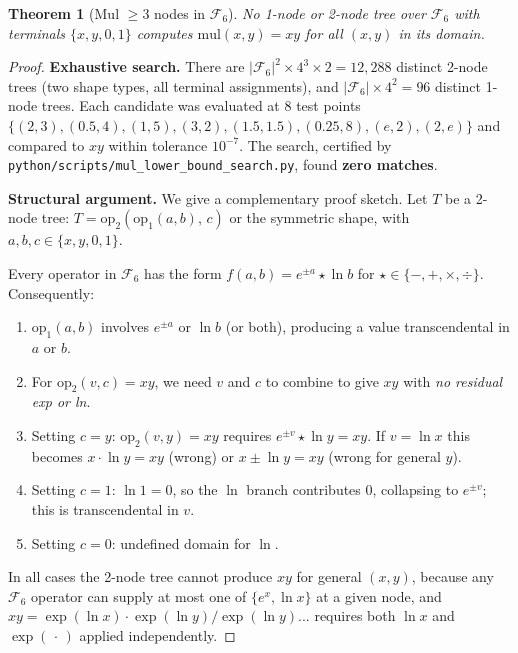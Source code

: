 \documentclass[11pt]{article}
\newtheorem{theorem}{Theorem}
\begin{document}
\begin{theorem}[Mul $\geq 3$ nodes in $\mathcal{F}_6$]\label{thm:lower6}
No 1-node or 2-node tree over $\mathcal{F}_6$ with terminals $\{x, y, 0, 1\}$
computes $\mathrm{mul}(x,y) = xy$ for all $(x,y)$ in its domain.
\end{theorem}

\begin{proof}
\textbf{Exhaustive search.}  There are $|\mathcal{F}_6|^2 \times 4^3 \times 2 = 12{,}288$
distinct 2-node trees (two shape types, all terminal assignments), and $|\mathcal{F}_6|
\times 4^2 = 96$ distinct 1-node trees.  Each candidate was evaluated at 8 test
points $\{(2,3),(0.5,4),(1,5),(3,2),(1.5,1.5),(0.25,8),(e,2),(2,e)\}$ and compared
to $xy$ within tolerance $10^{-7}$.  The search, certified by
\texttt{python/scripts/mul\_lower\_bound\_search.py}, found \textbf{zero matches}.

\smallskip
\textbf{Structural argument.}  We give a complementary proof sketch.
Let $T$ be a 2-node tree: $T = \mathrm{op}_2(\mathrm{op}_1(a,b),\, c)$ or the
symmetric shape, with $a,b,c \in \{x,y,0,1\}$.

Every operator in $\mathcal{F}_6$ has the form $f(a,b) = e^{\pm a} \star \ln b$
for $\star \in \{-,+,\times,\div\}$.  Consequently:
\begin{enumerate}
\item $\mathrm{op}_1(a,b)$ involves $e^{\pm a}$ or $\ln b$ (or both),
      producing a value transcendental in $a$ or $b$.
\item For $\mathrm{op}_2(v, c) = xy$, we need
      $v$ and $c$ to combine to give $xy$ with \emph{no residual exp or ln}.
\item Setting $c = y$: $\mathrm{op}_2(v,y) = xy$ requires
      $e^{\pm v} \star \ln y = xy$.  If $v = \ln x$ this becomes
      $x \cdot \ln y = xy$ (wrong) or $x \pm \ln y = xy$ (wrong for general $y$).
\item Setting $c = 1$: $\ln 1 = 0$, so the $\ln$ branch contributes 0,
      collapsing to $e^{\pm v}$; this is transcendental in $v$.
\item Setting $c = 0$: undefined domain for $\ln$.
\end{enumerate}
In all cases the 2-node tree cannot produce $xy$ for general $(x,y)$, because
any $\mathcal{F}_6$ operator can supply at most one of $\{e^x, \ln x\}$ at a
given node, and $xy = \exp(\ln x){\cdot}\exp(\ln y)/\exp(\ln y)$... requires
both $\ln x$ and $\exp(\,\cdot\,)$ applied independently.
\end{proof}
\end{document}
